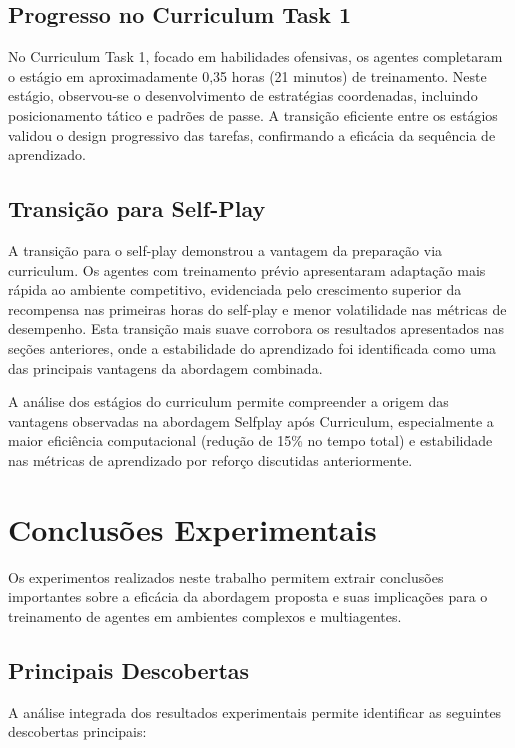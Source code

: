 \subsection{Progresso no Curriculum Task 1}

No Curriculum Task 1, focado em habilidades ofensivas, os agentes completaram o estágio em aproximadamente 0,35 horas (21 minutos) de treinamento. Neste estágio, observou-se o desenvolvimento de estratégias coordenadas, incluindo posicionamento tático e padrões de passe. A transição eficiente entre os estágios validou o design progressivo das tarefas, confirmando a eficácia da sequência de aprendizado.

\subsection{Transição para Self-Play}

A transição para o self-play demonstrou a vantagem da preparação via curriculum. Os agentes com treinamento prévio apresentaram adaptação mais rápida ao ambiente competitivo, evidenciada pelo crescimento superior da recompensa nas primeiras horas do self-play e menor volatilidade nas métricas de desempenho. Esta transição mais suave corrobora os resultados apresentados nas seções anteriores, onde a estabilidade do aprendizado foi identificada como uma das principais vantagens da abordagem combinada.

A análise dos estágios do curriculum permite compreender a origem das vantagens observadas na abordagem Selfplay após Curriculum, especialmente a maior eficiência computacional (redução de 15\% no tempo total) e estabilidade nas métricas de aprendizado por reforço discutidas anteriormente.

\section{Conclusões Experimentais}
\label{sec:conclusoes_experimentais}

Os experimentos realizados neste trabalho permitem extrair conclusões importantes sobre a eficácia da abordagem proposta e suas implicações para o treinamento de agentes em ambientes complexos e multiagentes.

\subsection{Principais Descobertas}

A análise integrada dos resultados experimentais permite identificar as seguintes descobertas principais:

